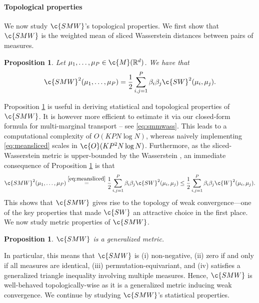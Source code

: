 \documentclass{article}
\newtheorem{proposition}[theorem]{Proposition}
\begin{document}
\paragraph{Topological properties}
We now study $\c{SMW}$'s  topological properties. We first show that  $\c{SMW}$  is the weighted mean of sliced Wasserstein distances between pairs of measures.

\begin{proposition}
Let $\mu_1,\dots,\mu_P \in \c{M}(\R^d)$. We have that
\[
\c{SMW}^2(\mu_1, \ldots, \mu_P)  = \frac{1}{2} \sum_{i,j=1}^P\beta_i \beta_j \c{SW}^2(\mu_i,\mu_j)
.
\label{eq:meansliced}
\] 
\label{prop:meansliced}
\end{proposition}
%
Proposition \ref{prop:meansliced} is useful in deriving statistical and topological properties of $\c{SMW}$. It is however more efficient to estimate it via our closed-form formula for multi-marginal transport -- see \eqref{eq:smmwass}. This leads to a computational complexity of $O(KPN\log N)$, whereas naively implementing \eqref{eq:meansliced} scales in $\c{O}(KP^2N\log N)$. 
%
Furthermore, as the sliced-Wasserstein metric is upper-bounded by the Wasserstein \cite{bonnottee}, an immediate consequence of Proposition \ref{prop:meansliced} is that 
\[
\c{SMW}^2(\mu_1, \ldots, \mu_P) \stackrel{\eqref{eq:meansliced}}{=} \frac{1}{2} \sum_{i,j=1}^P\beta_i \beta_j \c{SW}^2(\mu_i,\mu_j) \leq \frac{1}{2} \sum_{i,j=1}^P \beta_i \beta_j\c{W}^2(\mu_i,\mu_j).
\] 
This shows that $\c{SMW}$ gives rise to the topology of weak convergence---one of the key properties that made $\c{SW}$ an attractive choice in the first place. 
We now study metric properties of $\c{SMW}$.

\begin{proposition}
$\c{SMW}$ is a generalized metric.
\label{prop:metricprop}
\end{proposition}


In particular, this means that $\c{SMW}$ is (i) non-negative, (ii) zero if and only if all measures are identical, (iii) permutation-equivariant, and (iv) satisfies a generalized triangle inequality involving multiple measures. Hence, $\c{SMW}$ is well-behaved topologically-wise as it is a generalized metric inducing weak convergence. We continue by studying $\c{SMW}$'s statistical properties.
\end{document}
